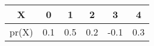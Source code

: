 \begin{tabular}{|c|c|c|c|c|c|}
\hline
X 	&0	&1	&2	&3	&4\\
\hline
pr(X)	&0.1	&0.5	&0.2	&-0.1	&0.3\\
\hline
\end{tabular}
